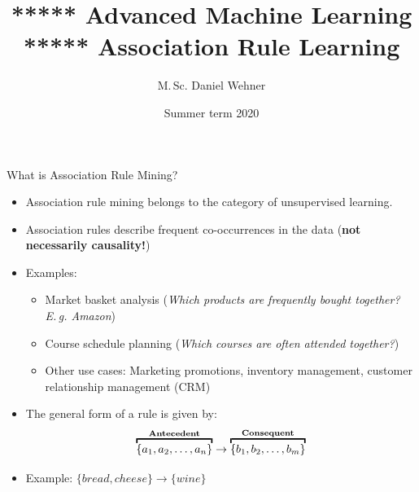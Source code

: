 




\title[Association Rule Learning]{***** Advanced Machine Learning ***** Association Rule Learning}
\author{M.\,Sc. Daniel Wehner}
\date{Summer term 2020}




\dwPrintTitle

\dwPrintToc


\begin{dwHeaderFrame}{What is Association Rule Mining?}
	\begin{itemize}
		\item Association rule mining belongs to the category of unsupervised learning.
		\item Association rules describe frequent co-occurrences in the data (\textbf{not necessarily causality!})
		\item Examples:
		\begin{itemize}
			\item Market basket analysis (\textit{Which products are frequently bought together? E.\,g. Amazon})
			\item Course schedule planning (\textit{Which courses are often attended together?})
			\item Other use cases: Marketing promotions, inventory management, customer relationship management (CRM) 
		\end{itemize}
		\item The general form of a rule is given by:
		\begin{equation}
			\overbracket{\{a_1, a_2, \dots, a_n\}}^{\text{\textbf{Antecedent}}} 
			\rightarrow 
			\overbracket{\{b_1, b_2, \dots, b_m\}}^{\text{\textbf{Consequent}}}
		\end{equation}
		\item Example: $\{ bread, cheese \} \rightarrow \{ wine \}$
	\end{itemize}
\end{dwHeaderFrame}


